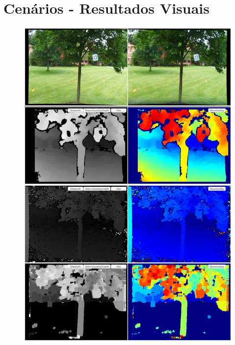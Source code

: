 \section{Cenários - Resultados Visuais}
\label{resultsScenes}

\begin{figure}[H]
 	\centering
 	\includegraphics[scale=0.35]{./Resources/results/scene1_montage.jpg}
 	\caption{}
 	\label{scene1_montage}
\end{figure}

